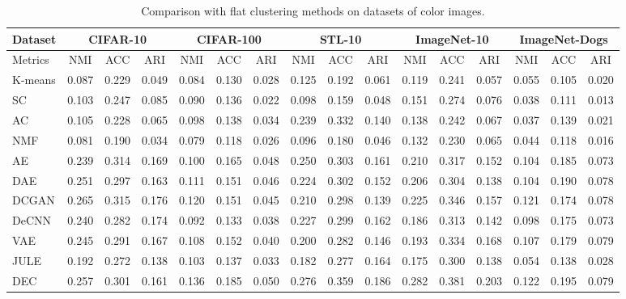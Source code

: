 \documentclass[runningheads]{llncs}
\begin{document}
\begin{table}[t]
\centering
\caption{Comparison with flat clustering methods on datasets of color images.
} \label{tab:large}
\tiny
\begin{tabular}{lccccccccccccccc}
\toprule
Dataset & \multicolumn{3}{c}{CIFAR-10} & \multicolumn{3}{c}{CIFAR-100} & \multicolumn{3}{c}{STL-10} & \multicolumn{3}{c}{ImageNet-10} & \multicolumn{3}{c}{ImageNet-Dogs} \\
\midrule
Metrics & NMI & ACC & ARI & NMI & ACC & ARI & NMI & ACC & ARI & NMI & ACC & ARI & NMI & ACC & ARI \\
\midrule
K-means \cite{MacQueen} & 0.087 & 0.229 & 0.049 & 0.084 & 0.130 & 0.028 & 0.125 & 0.192 & 0.061 & 0.119 & 0.241 & 0.057 & 0.055 & 0.105 & 0.020 \\
SC \cite{Zelnik2004} & 0.103 & 0.247 & 0.085 & 0.090 & 0.136 & 0.022 & 0.098 & 0.159 & 0.048 & 0.151 & 0.274 & 0.076 & 0.038 & 0.111 & 0.013 \\
AC \cite{Gowda1978AgglomerativeCU} & 0.105 & 0.228 & 0.065 & 0.098 & 0.138 &  0.034  & 0.239 & 0.332 & 0.140 & 0.138 & 0.242 & 0.067 & 0.037 & 0.139 & 0.021 \\
NMF \cite{Cai2009} & 0.081 & 0.190 & 0.034 & 0.079 & 0.118 & 0.026  & 0.096 & 0.180 & 0.046 & 0.132 & 0.230 & 0.065 & 0.044 & 0.118 & 0.016 \\
AE \cite{Bengio2006} & 0.239 & 0.314 & 0.169 & 0.100 & 0.165 & 0.048  & 0.250 & 0.303 & 0.161 & 0.210 & 0.317 & 0.152 & 0.104 & 0.185 & 0.073 \\
DAE \cite{vincent2010} & 0.251 & 0.297 & 0.163 & 0.111 & 0.151 & 0.046 & 0.224 & 0.302 & 0.152 & 0.206 & 0.304 & 0.138 & 0.104 & 0.190 & 0.078 \\
DCGAN \cite{Radford2015} & 0.265 & 0.315 & 0.176 &  0.120 & 0.151 & 0.045 & 0.210 & 0.298 & 0.139 & 0.225 & 0.346 & 0.157 & 0.121 & 0.174 & 0.078 \\
DeCNN \cite{Zeiler2010} & 0.240 & 0.282 & 0.174 & 0.092 & 0.133 & 0.038 & 0.227 & 0.299 & 0.162 & 0.186 & 0.313 & 0.142 & 0.098 & 0.175 & 0.073 \\
VAE \cite{kingma2013} & 0.245 & 0.291 & 0.167 & 0.108 & 0.152 & 0.040 & 0.200 & 0.282 & 0.146 & 0.193 & 0.334 & 0.168 & 0.107 & 0.179 & 0.079 \\
JULE \cite{yang2016joint} & 0.192 & 0.272 & 0.138 &  0.103 & 0.137 & 0.033 & 0.182 & 0.277 & 0.164 & 0.175 & 0.300 & 0.138 & 0.054 & 0.138 & 0.028 \\
DEC \cite{xie2016unsupervised} & 0.257 & 0.301 & 0.161 &  0.136 & 0.185 & 0.050 & 0.276 & 0.359 & 0.186 & 0.282 & 0.381 & 0.203 & 0.122 & 0.195 & 0.079 \\

\end{tabular}
\end{table}
\end{document}
